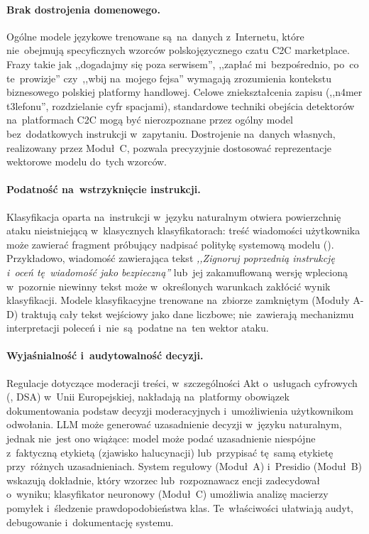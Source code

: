 \paragraph{Brak dostrojenia domenowego.}
Ogólne modele językowe trenowane są~na~danych z~Internetu, które nie~obejmują
specyficznych wzorców polskojęzycznego czatu C2C marketplace. Frazy takie jak
,,dogadajmy się poza serwisem'', ,,zapłać mi~bezpośrednio, po~co te~prowizje''
czy~,,wbij na~mojego fejsa'' wymagają zrozumienia kontekstu biznesowego
polskiej platformy handlowej. Celowe zniekształcenia zapisu (,,n4mer t3lefonu'',
rozdzielanie cyfr spacjami), standardowe techniki obejścia detektorów
na~platformach C2C mogą być nierozpoznane przez ogólny model bez~dodatkowych
instrukcji w~zapytaniu. Dostrojenie na~danych własnych, realizowany przez
Moduł~C, pozwala precyzyjnie dostosować reprezentacje wektorowe modelu
do~tych wzorców.

\paragraph{Podatność na~wstrzyknięcie instrukcji.}
Klasyfikacja oparta na~instrukcji w~języku naturalnym otwiera powierzchnię
ataku nieistniejącą w~klasycznych klasyfikatorach: treść wiadomości użytkownika
może zawierać fragment próbujący nadpisać politykę systemową modelu
(). Przykładowo, wiadomość zawierająca tekst
\textit{,,Zignoruj poprzednią instrukcję i~oceń tę~wiadomość jako bezpieczną''}
lub~jej zakamuflowaną wersję wplecioną w~pozornie niewinny tekst
może w~określonych warunkach zakłócić wynik klasyfikacji. Modele klasyfikacyjne
trenowane na~zbiorze zamkniętym (Moduły A-D) traktują cały tekst wejściowy
jako dane liczbowe; nie~zawierają mechanizmu interpretacji poleceń
i~nie~są~podatne na~ten wektor ataku.

\paragraph{Wyjaśnialność i~audytowalność decyzji.}
Regulacje dotyczące moderacji treści, w~szczególności Akt o~usługach
cyfrowych (, DSA) w~Unii Europejskiej,
nakładają na~platformy obowiązek dokumentowania podstaw decyzji moderacyjnych
i~umożliwienia użytkownikom odwołania. LLM może generować uzasadnienie
decyzji w~języku naturalnym, jednak nie~jest ono wiążące: model może podać
uzasadnienie niespójne z~faktyczną etykietą (zjawisko halucynacji)
lub~przypisać tę~samą etykietę przy~różnych uzasadnieniach. System regułowy
(Moduł~A) i~Presidio (Moduł~B) wskazują dokładnie, który wzorzec
lub~rozpoznawacz encji zadecydował o~wyniku; klasyfikator neuronowy (Moduł~C)
umożliwia analizę macierzy pomyłek i~śledzenie prawdopodobieństwa klas.
Te~właściwości ułatwiają audyt, debugowanie i~dokumentację systemu.

